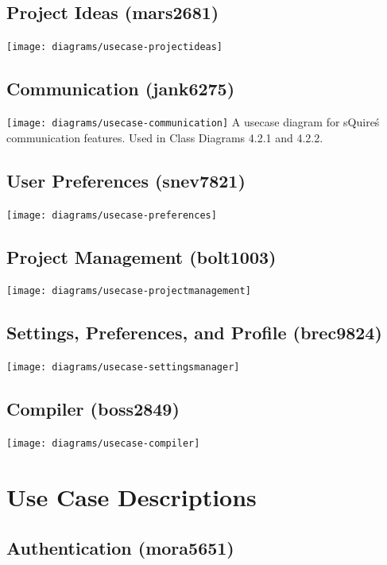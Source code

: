 \documentclass[11pt]{report}
\begin{document}
    \section{Project Ideas (mars2681)}
        \texttt{[image: diagrams/usecase-projectideas]}
    \section{Communication (jank6275)}
        \texttt{[image: diagrams/usecase-communication]}
        A usecase diagram for sQuire\'s communication features. Used in Class Diagrams 4.2.1 and 4.2.2.
    \section{User Preferences (snev7821)}
        \texttt{[image: diagrams/usecase-preferences]}
    \section{Project Management (bolt1003)}
        \texttt{[image: diagrams/usecase-projectmanagement]}
    \section{Settings, Preferences, and Profile (brec9824)}
        \texttt{[image: diagrams/usecase-settingsmanager]}
    \section{Compiler (boss2849)}
        \texttt{[image: diagrams/usecase-compiler]}
    
    
    
    



\chapter{Use Case Descriptions}

\section{Authentication (mora5651)}
\end{document}
